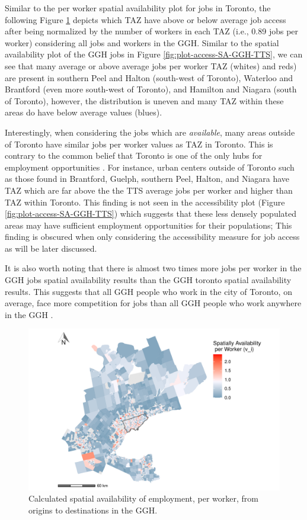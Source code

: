 \documentclass[]{elsarticle} %
\begin{document}
Similar to the per worker spatial availability plot for jobs in Toronto,
the following Figure \ref{fig:plot-avail-GGH-TTS-per-worker} depicts
which TAZ have above or below average job access after being normalized
by the number of workers in each TAZ (i.e., 0.89 jobs per worker)
considering all jobs and workers in the GGH. Similar to the spatial
availability plot of the GGH jobs in Figure
\ref{fig:plot-access-SA-GGH-TTS}, we can see that many average or above
average jobs per worker TAZ (whites) and reds) are present in southern
Peel and Halton (south-west of Toronto), Waterloo and Brantford (even
more south-west of Toronto), and Hamilton and Niagara (south of
Toronto), however, the distribution is uneven and many TAZ within these
areas do have below average values (blues).

Interestingly, when considering the jobs which are \emph{available},
many areas outside of Toronto have similar jobs per worker values as TAZ
in Toronto. This is contrary to the common belief that Toronto is one of
the only hubs for employment opportunities . For instance, urban centers
outside of Toronto such as those found in Brantford, Guelph, southern
Peel, Halton, and Niagara have TAZ which are far above the the TTS
average jobs per worker and higher than TAZ within Toronto. This finding
is not seen in the accessibility plot (Figure
\ref{fig:plot-access-SA-GGH-TTS}) which suggests that these less densely
populated areas may have sufficient employment opportunities for their
populations; This finding is obscured when only considering the
accessibility measure for job access as will be later discussed.

It is also worth noting that there is almost two times more jobs per
worker in the GGH jobs spatial availability results than the GGH toronto
spatial availability results. This suggests that all GGH people who work
in the city of Toronto, on average, face more competition for jobs than
all GGH people who work anywhere in the GGH .

\begin{figure}
\includegraphics[width=1\linewidth]{Spatial-Availability_files/figure-latex/plot-avail-GGH-TTS-per-worker-1} \caption{\label{fig:plot-avail-GGH-TTS-per-worker}Calculated spatial availability of employment, per worker, from origins to destinations in the GGH.}\label{fig:plot-avail-GGH-TTS-per-worker}
\end{figure}
\end{document}

